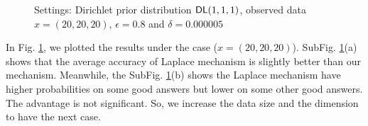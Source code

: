 \begin{figure}
\begin{center}
\centering
\caption{Settings: Dirichlet prior distribution $\mathsf{DL}(1,1,1)$, observed data $x = (20,20,20)$, $\epsilon = 0.8$ and $\delta = 0.000005$}
\label{fig_theory_20_20_20}
\end{center}
\end{figure}

In Fig. \ref{fig_theory_20_20_20}, we plotted the results under the case ($x = (20,20,20)$). SubFig. \ref{fig_theory_20_20_20}(a) shows that the average accuracy of Laplace mechanism is slightly better than our mechanism. Meanwhile, the SubFig. \ref{fig_theory_20_20_20}(b) shows the Laplace mechanism have higher probabilities on some good answers but lower on some other good answers. The advantage is not significant. So, we increase the data size and the dimension to have the next case.

